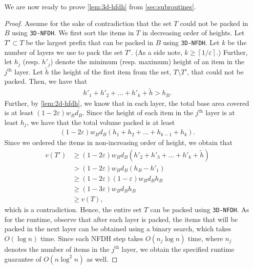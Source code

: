 \documentclass[10pt,a4paper]{amsart}
\newcommand{\kvn}[1]{#1}
\newcommand{\ceil}[1]{\left\lceil#1\right\rceil}    %
\newcommand{\eps}{\varepsilon}
\renewcommand{\tilde}{\widetilde}
\newcommand{\tNFDH}{\texttt{3D-NFDH}\xspace}
\newtheorem{lemma}[theorem]{Lemma}
\theoremstyle{definition}
\begin{document}
We are now ready to prove \cref{lem:3d-hfdh} from \cref{sec:subroutines}.
\threednfdh*
\begin{proof}
    Assume for the sake of contradiction that the set $T$ could not be packed in $B$ using \tNFDH. We first sort the items in $T$ in decreasing order of heights.
    Let $T'\subset T$ be the largest prefix that can be packed in $B$ using \tNFDH.
    Let $k$ be the number of layers we use to pack the set $T'$.
    (As a side note, $k\ge \ceil{1/\eps}$.)
    Further, let $h_j$ (resp. $h'_j$) denote the minimum (resp. maximum) height of an item in the $j^{\textrm{th}}$ layer.
    Let $\tilde h$ the height of the first item from the set, $T\setminus T'$, that could not be packed.
    Then, we have that
    \begin{align*}
        h'_1+h'_2+\dots+h'_k+\tilde{h}>h_B.
    \end{align*}
    Further, by \cref{lem:2d-hfdh}, we know that in each layer, the total base area covered is at least $(1-2\eps)w_Bd_B$.
    Since the height of each item in the $j^{\text{th}}$ layer is at least $h_j$, we have that the total volume packed is at least
    \begin{align*}
        (1-2\eps)w_Bd_B(h_1+h_2+\dots+h_{k-1}+h_k).
    \end{align*}
    Since we ordered the items in non-increasing order of height, we obtain that
    \begin{align*}
        v(T')&\ge(1-2\eps)w_Bd_B(h'_2+h'_3+\dots+h'_k+\tilde{h})\\
        &>(1-2\eps)w_Bd_B(h_B-h'_1)\\
        &\ge (1-2\eps)(1-\eps)w_Bd_Bh_B\\
        &\ge (1-3\eps)w_Bd_Bh_B\\
        &\ge v(T),
    \end{align*}
    which is a contradiction. \kvn{Hence, the entire set $T$ can be packed using \tNFDH{}. As for the runtime, observe that after each layer is packed,
    the items that will be packed in the next layer can be obtained using a binary search, which takes $O(\log n)$ time. Since each NFDH step takes $O(n_j\log n)$ time,
    where $n_j$ denotes the number of items in the $j^{\text{th}}$ layer, we obtain the specified runtime guarantee of $O(n\log^2 n)$ as well.}
\end{proof}
\end{document}
